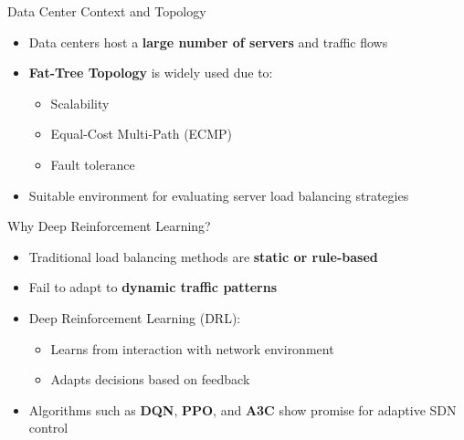 \documentclass[aspectratio=169]{beamer}
\begin{document}
\begin{frame}{Data Center Context and Topology}
\begin{itemize}
    \item Data centers host a \textbf{large number of servers} and traffic flows
    \item \textbf{Fat-Tree Topology} is widely used due to:
    \begin{itemize}
        \item Scalability
        \item Equal-Cost Multi-Path (ECMP)
        \item Fault tolerance
    \end{itemize}
    \item Suitable environment for evaluating server load balancing strategies
\end{itemize}
\end{frame}

\begin{frame}{Why Deep Reinforcement Learning?}
\begin{itemize}
    \item Traditional load balancing methods are \textbf{static or rule-based}
    \item Fail to adapt to \textbf{dynamic traffic patterns}
    \item Deep Reinforcement Learning (DRL):
    \begin{itemize}
        \item Learns from interaction with network environment
        \item Adapts decisions based on feedback
    \end{itemize}
    \item Algorithms such as \textbf{DQN}, \textbf{PPO}, and \textbf{A3C} show promise for adaptive SDN control
\end{itemize}
\end{frame}

\end{document}
